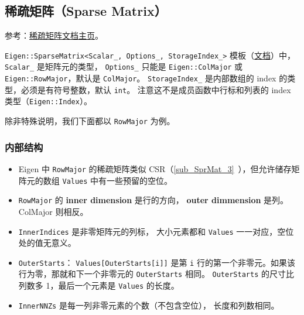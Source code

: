 \subsection{稀疏矩阵（Sparse Matrix）}

参考：\href{https://eigen.tuxfamily.org/dox/group__TutorialSparse.html}{稀疏矩阵文档主页}。

\verb|Eigen::SparseMatrix<Scalar_, Options_, StorageIndex_>| 模板（\href{https://eigen.tuxfamily.org/dox/classEigen_1_1SparseMatrix.html#a03de8b3da2c142ce8698a76123b3e7d3}{文档}）中，\verb|Scalar_| 是矩阵元的类型， \verb|Options_| 只能是 \verb|Eigen::ColMajor| 或 \verb|Eigen::RowMajor|，默认是 \verb|ColMajor|。 \verb|StorageIndex_| 是内部数组的 index 的类型，必须是有符号整数，默认 \verb|int|。 注意这不是成员函数中行标和列表的 index 类型（\verb|Eigen::Index|）。

除非特殊说明，我们下面都以 \verb|RowMajor| 为例。

\subsubsection{内部结构}
\begin{itemize}
\item Eigen 中 \verb|RowMajor| 的稀疏矩阵类似 CSR（\autoref{sub_SprMat_3}~），但允许储存矩阵元的数组 \verb|Values| 中有一些预留的空位。
\item \verb|RowMajor| 的 \textbf{inner dimension} 是行的方向， \textbf{outer dimmension} 是列。 ColMajor 则相反。
\item \verb|InnerIndices| 是非零矩阵元的列标， 大小元素都和 \verb|Values| 一一对应，空位处的值无意义。
\item \verb|OuterStarts|： \verb|Values[OuterStarts[i]]| 是第 \verb|i| 行的第一个非零元。如果该行为零，那就和下一个非零元的 \verb|OuterStarts| 相同。 \verb|OuterStarts| 的尺寸比列数多 1，最后一个元素是 \verb|Values| 的长度。
\item \verb|InnerNNZs| 是每一列非零元素的个数（不包含空位）， 长度和列数相同。
\end{itemize}

